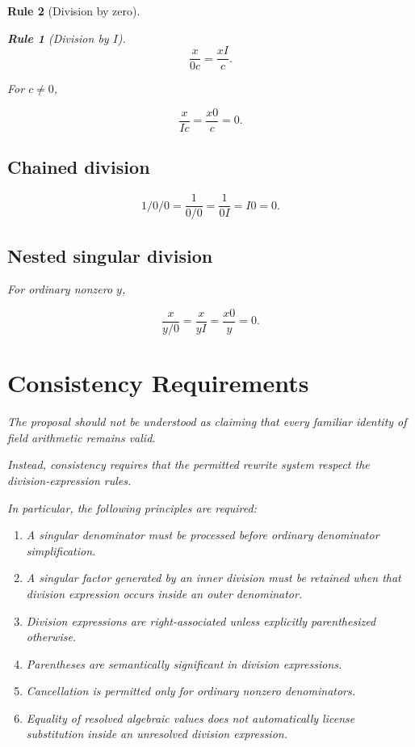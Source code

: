 \documentclass[11pt,a4paper]{article}
\newtheorem{rulethm}{Rule}[section]
\begin{document}
\begin{rulethm}[Division by zero]
\begin{rulethm}[Division by $I$]
\[
\frac{x}{0c}
=
\frac{xI}{c}.
\]

For $c\neq0$,

\[
\frac{x}{Ic}
=
\frac{x0}{c}
=
0.
\]

\subsection{Chained division}

\[
1/0/0
=
\frac1{0/0}
=
\frac1{0I}
=
I0
=
0.
\]

\subsection{Nested singular division}

For ordinary nonzero $y$,

\[
\frac{x}{y/0}
=
\frac{x}{yI}
=
\frac{x0}{y}
=
0.
\]

\section{Consistency Requirements}

The proposal should not be understood as claiming that every familiar
identity of field arithmetic remains valid.

Instead, consistency requires that the permitted rewrite system respect the
division-expression rules.

In particular, the following principles are required:

\begin{enumerate}
    \item A singular denominator must be processed before ordinary
    denominator simplification.
    
    \item A singular factor generated by an inner division must be retained
    when that division expression occurs inside an outer denominator.
    
    \item Division expressions are right-associated unless explicitly
    parenthesized otherwise.
    
    \item Parentheses are semantically significant in division expressions.
    
    \item Cancellation is permitted only for ordinary nonzero denominators.
    
    \item Equality of resolved algebraic values does not automatically
    license substitution inside an unresolved division expression.
    

\end{enumerate}
\end{rulethm}
\end{rulethm}
\end{document}
